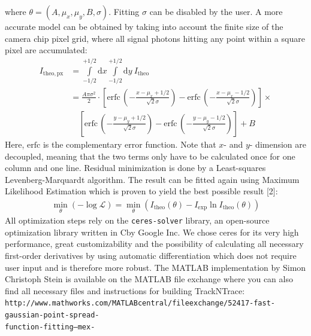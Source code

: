 \documentclass[11pt,onside]{report}
\newcommand{\D}[0]{\text{d}}
\numberwithin{equation}{chapter}
\def\CC{{C\nolinebreak[4]\hspace{-.05em}\raisebox{.4ex}{\tiny\bf ++}}}
\begin{document}
where $\theta = (A,\mu_x,\mu_y,B,\sigma)$. Fitting $\sigma$ can be disabled by the user. A more accurate model can be obtained by taking into account the finite size of the camera chip pixel grid, where all signal photons hitting any point within a square pixel are accumulated:
\begin{align*}
I_\mathrm{theo, px} &= \int\limits^{+1\slash 2}_{-1\slash 2} \D x \int\limits^{+1\slash 2}_{-1\slash 2} \D y\: I_\mathrm{theo} \\
&= \frac{A \pi \sigma^2}{2}\cdot \left[\mathrm{erfc}\,\left(-\frac{x-\mu_x+1\slash 2}{\sqrt{2} \sigma}\right) - \mathrm{erfc}\,\left(-\frac{x-\mu_x-1\slash 2}{\sqrt{2} \sigma}\right)\right] \times \\
&\quad \left[\mathrm{erfc}\,\left(-\frac{y-\mu_y+1\slash 2}{\sqrt{2} \sigma}\right) - \mathrm{erfc}\,\left(-\frac{y-\mu_y-1\slash 2}{\sqrt{2} \sigma}\right)\right] +B
\end{align*}
Here, $\mathrm{erfc}$ is the complementary error function. Note that $x$- and $y$- dimension are decoupled, meaning that the two terms only have to be calculated once for one column and one line. Residual minimization is done by a Least-squares Levenberg-Marquardt algorithm. The result can be fitted again using Maximum Likelihood Estimation which is proven to yield the best possible result [2]:
\begin{align*}
\min_\theta (-\log\mathcal{L}) = \min_\theta (I_\mathrm{theo}(\theta) - I_\mathrm{exp} \ln I_\mathrm{theo}(\theta))
\end{align*}
All optimization steps rely on the \texttt{ceres-solver} library, an open-source optimization library written in \CC by Google Inc. We chose ceres for its very high performance, great customizability and the possibility of calculating all necessary first-order derivatives by using automatic differentiation which does not require user input and is therefore more robust. The MATLAB implementation by Simon Christoph Stein is available on the MATLAB file exchange where you can also find all necessary files and instructions for building {TrackNTrace}:  \texttt{http://www.mathworks.com/MATLABcentral/fileexchange/52417-fast-gaussian-point-spread-\\function-fitting--mex-}\\[10pt]
\end{document}
